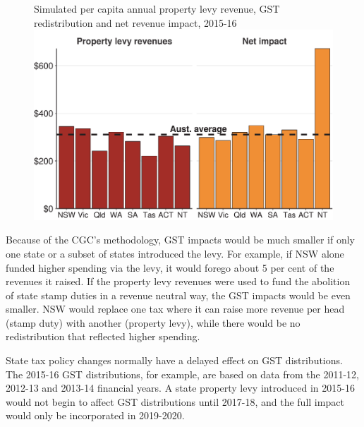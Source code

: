 \documentclass[twoside,english]{grattanBudgetRepairb5portrait}
\begin{document}
\begin{figure}
%
{Simulated per capita annual property levy revenue, GST redistribution and net revenue impact, 2015-16}%
\includegraphics[width=\columnwidth]{Property-taxes/atlas/figure/Figure7-1.pdf}

\end{figure}

Because of the CGC’s methodology, GST impacts would be much smaller if only one state or a subset of states introduced the levy. For example, if NSW alone funded higher spending via the levy, it would forego about 5 per cent of the revenues it raised. If the property levy revenues were used to fund the abolition of state stamp duties in a revenue neutral way, the GST impacts would be even smaller. NSW would replace one tax where it can raise more revenue per head (stamp duty) with another (property levy), while there would be no redistribution that reflected higher spending.  

State tax policy changes normally have a delayed effect on GST distributions. The 2015-16 GST distributions, for example, are based on data from the 2011-12, 2012-13 and 2013-14 financial years. A state property levy introduced in 2015-16 would not begin to affect GST distributions until 2017-18, and the full impact would only be incorporated in 2019-2020. 
\end{document}
